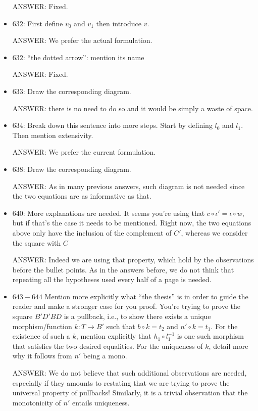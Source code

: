 \documentclass[english,11pt,a4paper]{article}
\begin{document}
\begin{itemize}
ANSWER: Fixed.

\item $632$: First define $v_0$ and $v_1$ then introduce $v$.

ANSWER: We prefer the actual formulation.

\item $632$: ``the dotted arrow'': mention its name

ANSWER: Fixed.

\item $633$: Draw the corresponding diagram.

{\color{red} ANSWER: there is no need to do so and it would be simply a waste of space.}


\item $634$: Break down this sentence into more steps. Start by defining $l_0$ and $l_1$. Then mention extensivity.

ANSWER: We prefer the current formulation.

\item $638$: Draw the corresponding diagram.

{\color{red} ANSWER: As in many previous answers, such diagram is not needed since the two equations are as informative as that.}

\item $640$: More explanations are needed. It seems you're using that $c \circ \iota' = \iota \circ w$, but if that's the case it needs to be mentioned. Right now, the two equations above only have the inclusion of the complement of $C'$, whereas we consider the square with $C$

ANSWER: Indeed we are using that property, which hold by the observations before the bullet points. As in the answers before, we do not think that repeating all the hypotheses used every half of a page is needed. 

\item $643-644$ Mention more explicitly what ``the thesis'' is in order to guide the reader and make a stronger case for you proof. You're trying to prove the square $B'D'BD$ is a pullback, i.e., to show there exists a unique morphism/function $k \colon  T \to B'$ such that $b\circ k=t_2$ and $n'\circ k = t_1$. For the existence of such a $k$, mention explicitly that $h_1 \circ l_1^{-1}$ is one such morphism that satisfies the two desired equalities. For the uniqueness of $k$, detail more why it follows from $n'$ being a mono.

ANSWER:  We do not believe that such additional observations are needed, especially if they amounts to restating that we are trying to prove the universal property of pullbacks! Similarly, it is a trivial observation that the monotonicity of $n'$ entails uniqueness.


\end{itemize}
\end{document}
